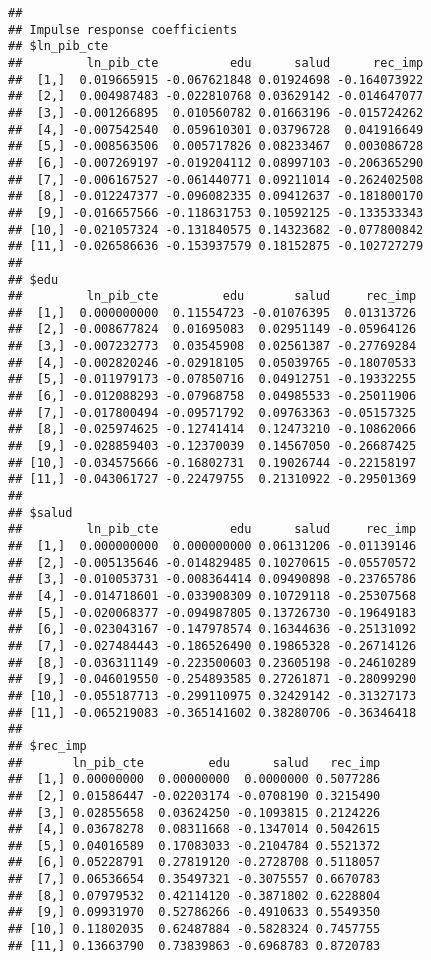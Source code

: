 \documentclass[]{book}
\theoremstyle{definition}
\theoremstyle{definition}
\theoremstyle{definition}
\theoremstyle{remark}
\begin{document}
\begin{verbatim}
## 
## Impulse response coefficients
## $ln_pib_cte
##         ln_pib_cte          edu      salud      rec_imp
##  [1,]  0.019665915 -0.067621848 0.01924698 -0.164073922
##  [2,]  0.004987483 -0.022810768 0.03629142 -0.014647077
##  [3,] -0.001266895  0.010560782 0.01663196 -0.015724262
##  [4,] -0.007542540  0.059610301 0.03796728  0.041916649
##  [5,] -0.008563506  0.005717826 0.08233467  0.003086728
##  [6,] -0.007269197 -0.019204112 0.08997103 -0.206365290
##  [7,] -0.006167527 -0.061440771 0.09211014 -0.262402508
##  [8,] -0.012247377 -0.096082335 0.09412637 -0.181800170
##  [9,] -0.016657566 -0.118631753 0.10592125 -0.133533343
## [10,] -0.021057324 -0.131840575 0.14323682 -0.077800842
## [11,] -0.026586636 -0.153937579 0.18152875 -0.102727279
## 
## $edu
##         ln_pib_cte         edu       salud     rec_imp
##  [1,]  0.000000000  0.11554723 -0.01076395  0.01313726
##  [2,] -0.008677824  0.01695083  0.02951149 -0.05964126
##  [3,] -0.007232773  0.03545908  0.02561387 -0.27769284
##  [4,] -0.002820246 -0.02918105  0.05039765 -0.18070533
##  [5,] -0.011979173 -0.07850716  0.04912751 -0.19332255
##  [6,] -0.012088293 -0.07968758  0.04985533 -0.25011906
##  [7,] -0.017800494 -0.09571792  0.09763363 -0.05157325
##  [8,] -0.025974625 -0.12741414  0.12473210 -0.10862066
##  [9,] -0.028859403 -0.12370039  0.14567050 -0.26687425
## [10,] -0.034575666 -0.16802731  0.19026744 -0.22158197
## [11,] -0.043061727 -0.22479755  0.21310922 -0.29501369
## 
## $salud
##         ln_pib_cte          edu      salud     rec_imp
##  [1,]  0.000000000  0.000000000 0.06131206 -0.01139146
##  [2,] -0.005135646 -0.014829485 0.10270615 -0.05570572
##  [3,] -0.010053731 -0.008364414 0.09490898 -0.23765786
##  [4,] -0.014718601 -0.033908309 0.10729118 -0.25307568
##  [5,] -0.020068377 -0.094987805 0.13726730 -0.19649183
##  [6,] -0.023043167 -0.147978574 0.16344636 -0.25131092
##  [7,] -0.027484443 -0.186526490 0.19865328 -0.26714126
##  [8,] -0.036311149 -0.223500603 0.23605198 -0.24610289
##  [9,] -0.046019550 -0.254893585 0.27261871 -0.28099290
## [10,] -0.055187713 -0.299110975 0.32429142 -0.31327173
## [11,] -0.065219083 -0.365141602 0.38280706 -0.36346418
## 
## $rec_imp
##       ln_pib_cte         edu      salud   rec_imp
##  [1,] 0.00000000  0.00000000  0.0000000 0.5077286
##  [2,] 0.01586447 -0.02203174 -0.0708190 0.3215490
##  [3,] 0.02855658  0.03624250 -0.1093815 0.2124226
##  [4,] 0.03678278  0.08311668 -0.1347014 0.5042615
##  [5,] 0.04016589  0.17083033 -0.2104784 0.5521372
##  [6,] 0.05228791  0.27819120 -0.2728708 0.5118057
##  [7,] 0.06536654  0.35497321 -0.3075557 0.6670783
##  [8,] 0.07979532  0.42114120 -0.3871802 0.6228804
##  [9,] 0.09931970  0.52786266 -0.4910633 0.5549350
## [10,] 0.11802035  0.62487884 -0.5828324 0.7457755
## [11,] 0.13663790  0.73839863 -0.6968783 0.8720783
\end{verbatim}
\end{document}
